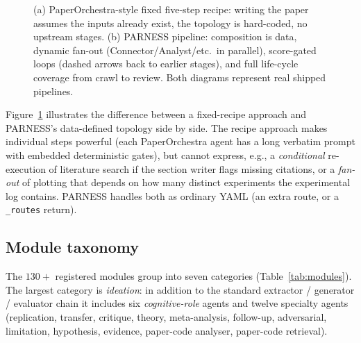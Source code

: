 \documentclass{article}
\newcommand{\parness}{\textsf{PARNESS}}
\newcommand{\code}[1]{\texttt{\small #1}}
\begin{document}
\begin{figure}[t]
\caption{(a) PaperOrchestra-style fixed five-step recipe: writing the
paper assumes the inputs already exist, the topology is hard-coded, no
upstream stages. (b) \parness{} pipeline: composition is data, dynamic
fan-out (Connector/Analyst/etc.\ in parallel), score-gated loops (dashed
arrows back to earlier stages), and full life-cycle coverage from crawl
to review. Both diagrams represent real shipped pipelines.}
\label{fig:recipe-vs-dag}
\end{figure}

Figure~\ref{fig:recipe-vs-dag} illustrates the difference between a
fixed-recipe approach and \parness{}'s data-defined topology side by
side. The recipe approach makes individual steps powerful (each
PaperOrchestra agent has a long verbatim prompt with embedded
deterministic gates), but cannot express, e.g., a \emph{conditional}
re-execution of literature search if the section writer flags missing
citations, or a \emph{fan-out} of plotting that depends on how many
distinct experiments the experimental log contains. \parness{} handles
both as ordinary YAML (an extra route, or a \code{\_routes} return).

\subsection{Module taxonomy}
\label{sec:modules}

The $130{+}$ registered modules group into seven categories
(Table~\ref{tab:modules}). The largest category is \emph{ideation}: in
addition to the standard extractor / generator / evaluator chain it
includes six \emph{cognitive-role} agents and twelve specialty agents
(replication, transfer, critique, theory, meta-analysis, follow-up,
adversarial, limitation, hypothesis, evidence, paper-code analyser,
paper-code retrieval).
\end{document}
